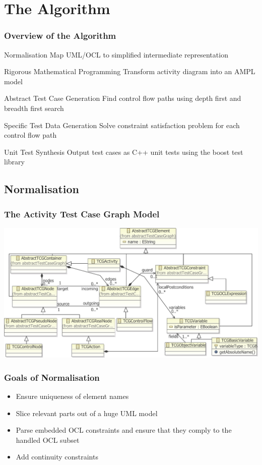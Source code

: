 \documentclass{beamer}
\begin{document}
\section{The Algorithm}
\begin{frame}
\frametitle{Overview of the Algorithm}
\begin{block}{Normalisation}
Map UML/OCL to simplified intermediate representation
\end{block}
\begin{block}{Rigorous Mathematical Programming}
Transform activity diagram into an AMPL model
\end{block}
\begin{block}{Abstract Test Case Generation}
Find control flow paths using depth first and breadth first search
\end{block}
\begin{block}{Specific Test Data Generation}
Solve constraint satisfaction problem for each control flow path
\end{block}
\begin{block}{Unit Test Synthesis}
Output test cases as C++ unit tests using the boost test library
\end{block}
\end{frame}
\subsection{Normalisation}
\begin{frame}
\frametitle{The Activity Test Case Graph Model}
	\includegraphics[width=\textwidth]{../IntermediatePresentation/pics/completeMetamodelforSlideshowN.pdf}
\end{frame}
\begin{frame}
\frametitle{Goals of Normalisation}
\begin{itemize}
  \item Ensure uniqueness of element names
  \item Slice relevant parts out of a huge UML model
  \item Parse embedded OCL constraints and ensure that they comply to the handled OCL subset
  \item Add continuity constraints 
\end{itemize}
\end{frame}
\end{document}
